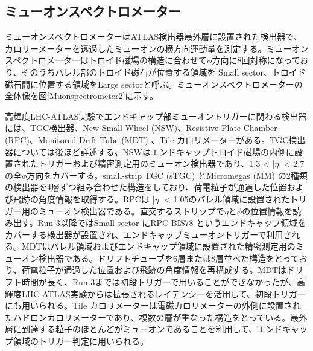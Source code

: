 \subsection{ミューオンスペクトロメーター}
\label{subsec_Muonspectrometer}
ミューオンスペクトロメーターはATLAS検出器最外層に設置された検出器で、カロリーメーターを透過したミューオンの横方向運動量を測定する。ミューオンスペクトロメーターはトロイド磁場の構造に合わせて$\phi$方向に8回対称になっており、そのうちバレル部のトロイド磁石が位置する領域を Small sector、トロイド磁石間に位置する領域をLarge sectorと呼ぶ。ミューオンスペクトロメーターの全体像を図\ref{Muonspectrometer2}に示す。

高輝度LHC-ATLAS実験でエンドキャップ部ミューオントリガーに関わる検出器には、TGC検出器、New Small Wheel (NSW)、Resistive Plate Chamber (RPC)、Monitored Drift Tube (MDT) 、Tile カロリメーターがある。TGC検出器については後ほど詳述する。NSWはエンドキャップトロイド磁場の内側に設置されたトリガーおよび精密測定用のミューオン検出器であり、1.3 < |$\eta$| < 2.7の全$\phi$方向をカバーする。small-strip TGC (sTGC) とMicromegas (MM) の2種類の検出器を4層ずつ組み合わせた構造をしており、荷電粒子が通過した位置および飛跡の角度情報を取得する。RPCは |$\eta$| < 1.05のバレル領域に設置されたトリガー用のミューオン検出器である。直交するストリップで$\eta$と$\phi$の位置情報を読み出す。Run 3以降ではSmall sector にRPC BIS78 というエンドキャップ領域をカバーする検出器が設置され、エンドキャップミューオントリガーで利用される。MDTはバレル領域およびエンドキャップ領域に設置された精密測定用のミューオン検出器である。ドリフトチューブを6層または8層並べた構造をとっており、荷電粒子が通過した位置および飛跡の角度情報を再構成する。MDTはドリフト時間が長く、Run 3までは初段トリガーで用いることができなかったが、高輝度LHC-ATLAS実験からは拡張されるレイテンシーを活用して、初段トリガーにも用いられる。Tile カロリメーターは電磁カロリメーターの外側に設置されたハドロンカロリメーターであり、複数の層が重なった構造をとっている。最外層に到達する粒子のほとんどがミューオンであることを利用して、エンドキャップ領域のトリガー判定に用いられる。


